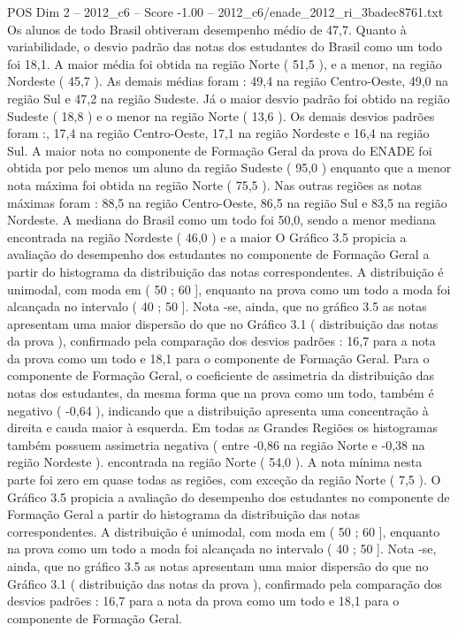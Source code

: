 \begin{textsample}{POS Dim 2 – 2012\_c6 – Score -1.00 – 2012\_c6/enade\_2012\_ri\_3badec8761.txt}
Os alunos de todo Brasil obtiveram desempenho médio de 47,7.
Quanto à variabilidade, o desvio padrão das notas dos estudantes do Brasil como um todo foi 18,1.
A maior média foi obtida na região Norte ( 51,5 ), e a menor, na região Nordeste ( 45,7 ).
As demais médias foram : 49,4 na região Centro-Oeste, 49,0 na região Sul e 47,2 na região Sudeste.
Já o maior desvio padrão foi obtido na região Sudeste ( 18,8 ) e o menor na região Norte ( 13,6 ).
Os demais desvios padrões foram :, 17,4 na região Centro-Oeste, 17,1 na região Nordeste e 16,4 na região Sul.
A maior nota no componente de Formação Geral da prova do ENADE foi obtida por pelo menos um aluno da região Sudeste ( 95,0 ) enquanto que a menor nota máxima foi obtida na região Norte ( 75,5 ).
Nas outras regiões as notas máximas foram : 88,5 na região Centro-Oeste, 86,5 na região Sul e 83,5 na região Nordeste.
A mediana do Brasil como um todo foi 50,0, sendo a menor mediana encontrada na região Nordeste ( 46,0 ) e a maior O Gráfico 3.5 propicia a avaliação do desempenho dos estudantes no componente de Formação Geral a partir do histograma da distribuição das notas correspondentes.
A distribuição é unimodal, com moda em ( 50 ; 60 ], enquanto na prova como um todo a moda foi alcançada no intervalo ( 40 ; 50 ].
Nota -se, ainda, que no gráfico 3.5 as notas apresentam uma maior dispersão do que no Gráfico 3.1 ( distribuição das notas da prova ), confirmado pela comparação dos desvios padrões : 16,7 para a nota da prova como um todo e 18,1 para o componente de Formação Geral.
Para o componente de Formação Geral, o coeficiente de assimetria da distribuição das notas dos estudantes, da mesma forma que na prova como um todo, também é negativo ( -0,64 ), indicando que a distribuição apresenta uma concentração à direita e cauda maior à esquerda.
Em todas as Grandes Regiões os histogramas também possuem assimetria negativa ( entre -0,86 na região Norte e -0,38 na região Nordeste ). encontrada na região Norte ( 54,0 ).
A nota mínima nesta parte foi zero em quase todas as regiões, com exceção da região Norte ( 7,5 ).
O Gráfico 3.5 propicia a avaliação do desempenho dos estudantes no componente de Formação Geral a partir do histograma da distribuição das notas correspondentes.
A distribuição é unimodal, com moda em ( 50 ; 60 ], enquanto na prova como um todo a moda foi alcançada no intervalo ( 40 ; 50 ].
Nota -se, ainda, que no gráfico 3.5 as notas apresentam uma maior dispersão do que no Gráfico 3.1 ( distribuição das notas da prova ), confirmado pela comparação dos desvios padrões : 16,7 para a nota da prova como um todo e 18,1 para o componente de Formação Geral.

\end{textsample}
